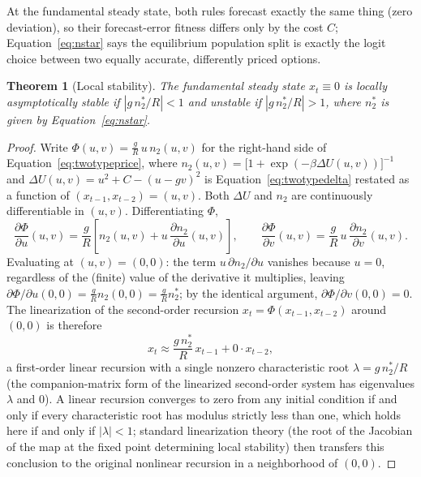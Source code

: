 \documentclass[11pt]{article}
\newtheorem{theorem}{Theorem}
\theoremstyle{remark}
\theoremstyle{definition}
\begin{document}
At the fundamental steady state, both rules forecast exactly the same thing (zero deviation), so their forecast-error fitness differs only by the cost $C$; Equation~\eqref{eq:nstar} says the equilibrium population split is exactly the logit choice between two equally accurate, differently priced options.

\begin{theorem}[Local stability]
\label{thm:stability}
The fundamental steady state $x_t\equiv0$ is locally asymptotically stable if $\left|g\,n_2^{*}/R\right|<1$ and unstable if $\left|g\,n_2^{*}/R\right|>1$, where $n_2^{*}$ is given by Equation~\eqref{eq:nstar}.
\end{theorem}
\begin{proof}
Write $\Phi(u,v) = \frac{g}{R}\,u\,n_2(u,v)$ for the right-hand side of Equation~\eqref{eq:twotypeprice}, where $n_2(u,v)=\big[1+\exp(-\beta\Delta U(u,v))\big]^{-1}$ and $\Delta U(u,v) = u^2+C-(u-gv)^2$ is Equation~\eqref{eq:twotypedelta} restated as a function of $(x_{t-1},x_{t-2})=(u,v)$. Both $\Delta U$ and $n_2$ are continuously differentiable in $(u,v)$. Differentiating $\Phi$,
\begin{equation*}
\frac{\partial \Phi}{\partial u}(u,v) = \frac{g}{R}\left[n_2(u,v) + u\,\frac{\partial n_2}{\partial u}(u,v)\right], \qquad
\frac{\partial \Phi}{\partial v}(u,v) = \frac{g}{R}\,u\,\frac{\partial n_2}{\partial v}(u,v).
\end{equation*}
Evaluating at $(u,v)=(0,0)$: the term $u\,\partial n_2/\partial u$ vanishes because $u=0$, regardless of the (finite) value of the derivative it multiplies, leaving $\partial\Phi/\partial u(0,0) = \tfrac{g}{R}n_2(0,0)=\tfrac{g}{R}n_2^{*}$; by the identical argument, $\partial\Phi/\partial v(0,0)=0$. The linearization of the second-order recursion $x_t=\Phi(x_{t-1},x_{t-2})$ around $(0,0)$ is therefore
\begin{equation*}
x_t \approx \frac{g\,n_2^{*}}{R}\,x_{t-1} + 0\cdot x_{t-2},
\end{equation*}
a first-order linear recursion with a single nonzero characteristic root $\lambda=g\,n_2^{*}/R$ (the companion-matrix form of the linearized second-order system has eigenvalues $\lambda$ and $0$). A linear recursion converges to zero from any initial condition if and only if every characteristic root has modulus strictly less than one, which holds here if and only if $|\lambda|<1$; standard linearization theory (the root of the Jacobian of the map at the fixed point determining local stability) then transfers this conclusion to the original nonlinear recursion in a neighborhood of $(0,0)$.
\end{proof}
\end{document}
